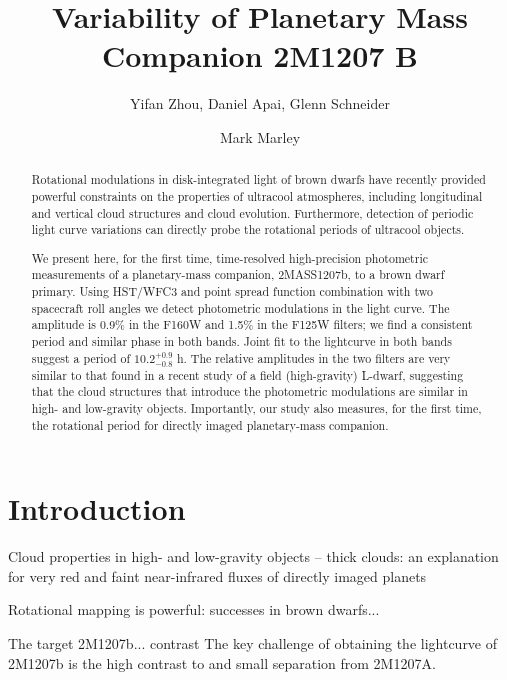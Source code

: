 \documentclass[apj]{emulateapj}
\begin{document}
\title{Variability of Planetary Mass Companion 2M1207 B}
\author{Yifan Zhou, Daniel Apai, Glenn Schneider}
\author{Mark Marley}

\begin{abstract} Rotational modulations in disk-integrated light of
brown dwarfs have recently provided powerful constraints on the
properties of ultracool atmospheres, including longitudinal and
vertical cloud structures and cloud evolution. Furthermore, detection
of periodic light curve variations can directly probe the rotational
periods of ultracool objects.

We present here, for the first time, time-resolved high-precision
photometric measurements of a planetary-mass companion, 2MASS1207b, to
a brown dwarf primary. Using HST/WFC3 and point spread function %
combination with two spacecraft roll angles we detect photometric
modulations in the light curve. The amplitude is 0.9\% in the F160W
and 1.5\% in the F125W filters; we find a consistent period and
similar phase in both bands. Joint fit to the lightcurve in both bands
suggest a period of $10.2^{+0.9}_{-0.8}$ h. The relative amplitudes in the two
filters are very similar to that found in a recent study of a field
(high-gravity) L-dwarf, suggesting that the cloud structures that
introduce the photometric modulations are similar in high- and
low-gravity objects. Importantly, our study also measures, for the
first time, the rotational period for directly imaged planetary-mass
companion.
\end{abstract}

\maketitle
%
\section{Introduction}

Cloud properties in high- and low-gravity objects -- thick clouds: an
explanation for very red and faint near-infrared fluxes of directly
imaged planets

Rotational mapping is powerful: successes in brown dwarfs...

The target 2M1207b... contrast The key challenge of obtaining the
lightcurve of 2M1207b is the high contrast to and small separation
from 2M1207A.
\end{document}
